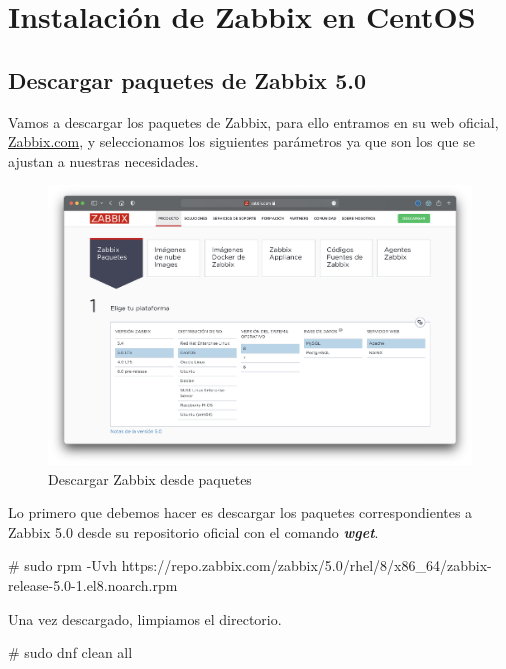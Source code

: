 \newpage
\section{Instalación de Zabbix en CentOS}
    \subsection{Descargar paquetes de Zabbix 5.0}
    Vamos a descargar los paquetes de Zabbix, para ello entramos en su web oficial, \href{https://www.zabbix.com/download}{Zabbix.com}, y 
    seleccionamos los siguientes parámetros ya que son los que se ajustan a nuestras necesidades.
    \begin{figure}[H]
        \centering
        \includegraphics[scale=0.3]{images/zabbix_centOS.png}
        \caption{Descargar Zabbix desde paquetes}
        \label{fig:zabbix_centOS}
    \end{figure}

    Lo primero que debemos hacer es descargar los paquetes correspondientes a Zabbix 5.0 desde su repositorio oficial con el comando \textbf{\emph{wget}}. 
        \begin{tcolorbox}[colback=black!10, halign=left]
            \# sudo rpm -Uvh https://repo.zabbix.com/zabbix/5.0/rhel/8/x86\_64/zabbix-release-5.0-1.el8.noarch.rpm
        \end{tcolorbox}

    Una vez descargado, limpiamos el directorio.
        \begin{tcolorbox}[colback=black!10, halign=left]
            \# sudo dnf clean all
        \end{tcolorbox}

